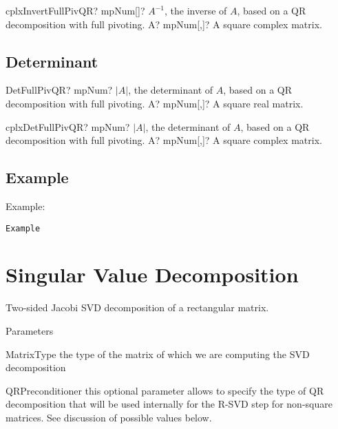 \vspace{0.6cm}
\begin{mpFunctionsExtract}
	\mpFunctionOne
	{cplxInvertFullPivQR? mpNum[]? $A^{-1}$, the inverse of $A$, based on a QR decomposition with full pivoting.}
	{A? mpNum[,]? A square complex matrix.}
\end{mpFunctionsExtract}





\subsection{Determinant}

\begin{mpFunctionsExtract}
	\mpFunctionOne
	{DetFullPivQR? mpNum? $|A|$, the determinant of $A$, based on a QR decomposition with full pivoting.}
	{A? mpNum[,]? A square real matrix.}
\end{mpFunctionsExtract}

\vspace{0.6cm}
\begin{mpFunctionsExtract}
	\mpFunctionOne
	{cplxDetFullPivQR? mpNum? $|A|$, the determinant of $A$, based on a QR decomposition with full pivoting.}
	{A? mpNum[,]? A square complex matrix.}
\end{mpFunctionsExtract}




\subsection{Example}
Example:
\begin{verbatim}
Example
\end{verbatim}





\newpage
\section{Singular Value Decomposition}
\label{Singular Value Decomposition}


Two-sided Jacobi SVD decomposition of a rectangular matrix. 

Parameters

MatrixType the type of the matrix of which we are computing the SVD decomposition  

QRPreconditioner this optional parameter allows to specify the type of QR decomposition that will be used internally for the R-SVD step for non-square matrices. See discussion of possible values below. 

